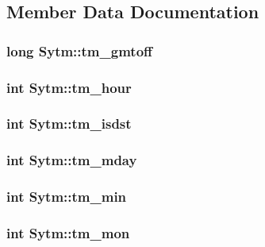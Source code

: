\subsection{Member Data Documentation}
\hypertarget{struct_sytm_a880507d829e84e0dd39dd2d5a02d465c}{
\subsubsection[{tm\-\_\-gmtoff}]{\setlength{\rightskip}{0pt plus 5cm}long Sytm\-::tm\-\_\-gmtoff}}\label{d9/dbb/struct_sytm_a880507d829e84e0dd39dd2d5a02d465c}
\hypertarget{struct_sytm_afe84b7656bd6817c9602b8cd89e5a449}{
\subsubsection[{tm\-\_\-hour}]{\setlength{\rightskip}{0pt plus 5cm}int Sytm\-::tm\-\_\-hour}}\label{d9/dbb/struct_sytm_afe84b7656bd6817c9602b8cd89e5a449}
\hypertarget{struct_sytm_a41f4fdca4d7c634a116f1a599fc2d0d9}{
\subsubsection[{tm\-\_\-isdst}]{\setlength{\rightskip}{0pt plus 5cm}int Sytm\-::tm\-\_\-isdst}}\label{d9/dbb/struct_sytm_a41f4fdca4d7c634a116f1a599fc2d0d9}
\hypertarget{struct_sytm_a62a32b02ba2a90732855fdfb4354647a}{
\subsubsection[{tm\-\_\-mday}]{\setlength{\rightskip}{0pt plus 5cm}int Sytm\-::tm\-\_\-mday}}\label{d9/dbb/struct_sytm_a62a32b02ba2a90732855fdfb4354647a}
\hypertarget{struct_sytm_af05de1950d1dad912e1a6ad39c3977e1}{
\subsubsection[{tm\-\_\-min}]{\setlength{\rightskip}{0pt plus 5cm}int Sytm\-::tm\-\_\-min}}\label{d9/dbb/struct_sytm_af05de1950d1dad912e1a6ad39c3977e1}
\hypertarget{struct_sytm_af4d4e4e7102cd0ab3aca2147a4914c56}{
\subsubsection[{tm\-\_\-mon}]{\setlength{\rightskip}{0pt plus 5cm}int Sytm\-::tm\-\_\-mon}}\label{d9/dbb/struct_sytm_af4d4e4e7102cd0ab3aca2147a4914c56}
